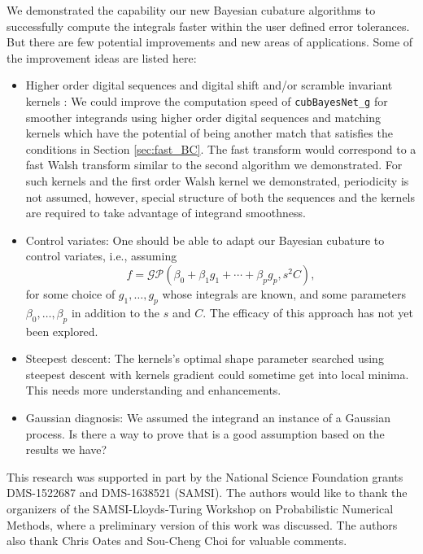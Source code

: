 \documentclass{iitthesis}          %
\newcommand{\code}[1]{\texttt{#1}}
\begin{document}
{{{{{{

We demonstrated the capability our new Bayesian cubature algorithms to successfully compute the integrals faster within the user defined error tolerances. But there are few potential improvements and new areas of applications.
Some of the improvement ideas are listed here:
\begin{itemize}
\item Higher order digital sequences and digital shift and/or scramble invariant kernels \cite{Nuyens2013} \cite{Bald12a}:
We could improve the computation speed of \code{cubBayesNet\_g} for smoother integrands using higher order digital sequences and matching kernels which have the potential of being another match that satisfies the conditions in Section \ref{sec:fast_BC}.  The fast transform would correspond to a fast Walsh transform similar to the second algorithm we demonstrated.  For such kernels and the first order Walsh kernel we demonstrated, periodicity is not assumed, however, special structure of both the sequences and the kernels are required to take advantage of integrand smoothness.

\item Control variates:
One should be able to adapt our Bayesian cubature to control variates, i.e., assuming  
\begin{equation*}
f = \mathcal{GP} \left( \beta_0 + \beta_1 g_1 + \cdots + \beta_p g_p, s^2 C \right),
\end{equation*}
for some choice of $g_1, \ldots, g_p$ whose integrals are known, and some parameters $\beta_0, \ldots, \beta_p$ in addition to the $s$ and $C$.  The efficacy of this approach has not yet been explored.

\item Steepest descent: 
The kernels's optimal shape parameter searched using steepest descent with kernels gradient could sometime get into local minima. This needs more understanding and enhancements.


\item Gaussian diagnosis: We assumed the integrand an instance of a Gaussian process. Is there a way to prove that is a good assumption based on the results we have?


\end{itemize}

This research was supported in part by the National Science Foundation grants DMS-1522687 and DMS-1638521 (SAMSI).
The authors would like to thank the organizers of the SAMSI-Lloyds-Turing Workshop on Probabilistic Numerical Methods, where a preliminary version of this work was discussed.  The authors also thank Chris Oates and Sou-Cheng Choi for valuable comments.


}}}}}}
\end{document}
